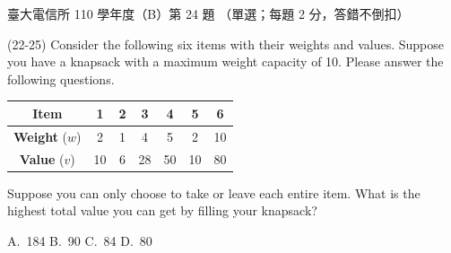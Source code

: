\begin{pastexam}[label={px:ntu-110-comm-dsa-24}]{臺大電信所 110 學年度（B）第 24 題}
（單選；每題 2 分，答錯不倒扣）

(22-25) Consider the following six items with their weights and values. Suppose you have a knapsack with a maximum weight capacity of 10. Please answer the following questions.
\begin{center}
\begin{tabular}{|c|c|c|c|c|c|c|}
\hline
\textbf{Item} & \textbf{1} & \textbf{2} & \textbf{3} & \textbf{4} & \textbf{5} & \textbf{6}\\ \hline
\textbf{Weight} ($w$) & 2 & 1 & 4 & 5 & 2 & 10\\ \hline
\textbf{Value} ($v$) & 10 & 6 & 28 & 50 & 10 & 80\\ \hline
\end{tabular}
\end{center}

Suppose you can only choose to take or leave each entire item. What is the highest total value you can get by filling your knapsack?

A.~184 \qquad B.~90 \qquad C.~84 \qquad D.~80
\end{pastexam}

